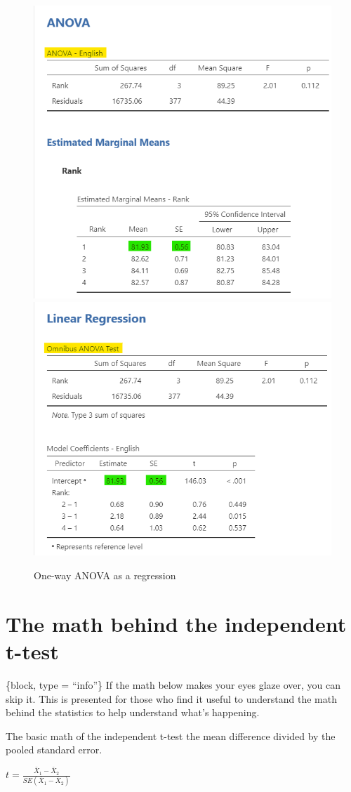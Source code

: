 \documentclass[
]{book}
\begin{document}
\begin{figure}

{\centering \includegraphics[width=0.49\linewidth]{images/14-regression-wrap-up/anova1} \includegraphics[width=0.49\linewidth]{images/14-regression-wrap-up/anova2} 

}

\caption{One-way ANOVA as a regression}\label{fig:unnamed-chunk-4}
\end{figure}

\hypertarget{appendix-appendices}{%
\appendix}


\hypertarget{the-math-behind-the-independent-t-test}{%
\chapter{The math behind the independent t-test}\label{the-math-behind-the-independent-t-test}}

\{block, type = ``info''\}
If the math below makes your eyes glaze over, you can skip it. This is presented for those who find it useful to understand the math behind the statistics to help understand what's happening.

The basic math of the independent t-test the mean difference divided by the pooled standard error.

\(t = \frac{\bar{X}_1 - \bar{X}_2}{SE({\bar{X}_1 - \bar{X}_2})}\)
\end{document}
